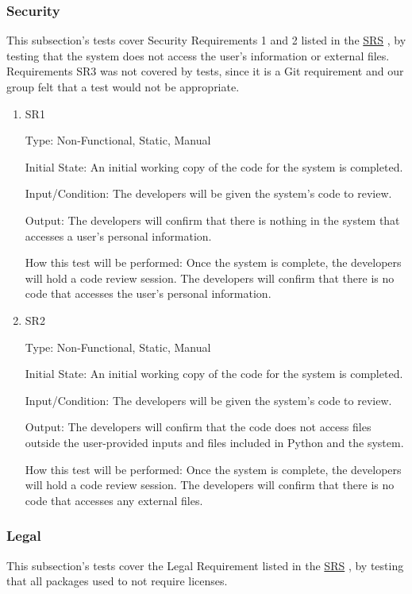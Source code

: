 \documentclass[12pt, titlepage]{article}
\begin{document}
\subsubsection{Security}
This subsection's tests cover Security Requirements 1 and 2 listed in the \href{https://github.com/paezha/PyERT-BLACK/blob/main/docs/SRS/SRS.pdf}{SRS} \citep{SRS}, by testing that the system does not access the user's information or external files. Requirements SR3 was not covered by tests, since it is a Git requirement and our group felt that a test would not be appropriate.

\begin{enumerate}

\item{SR1\\}\label{SR1}

Type: Non-Functional, Static, Manual
					
Initial State: 
An initial working copy of the code for the system is completed.

Input/Condition: 
The developers will be given the system's code to review.

Output: The developers will confirm that there is nothing in the system that accesses a user's personal information.

How this test will be performed:  Once the system is complete, the developers will hold a code review session. The developers will confirm that there is no code that accesses the user's personal information.
\\
\item{SR2\\}\label{SR2}

Type: Non-Functional, Static, Manual
					
Initial State: 
An initial working copy of the code for the system is completed.

Input/Condition: 
The developers will be given the system's code to review.

Output: The developers will confirm that the code does not access files outside the user-provided inputs and files included in Python and the system.

How this test will be performed:  Once the system is complete, the developers will hold a code review session. The developers will confirm that there is no code that accesses any external files.

\end{enumerate}

\subsubsection{Legal}
This subsection's tests cover the Legal Requirement listed in the \href{https://github.com/paezha/PyERT-BLACK/blob/main/docs/SRS/SRS.pdf}{SRS} \citep{SRS}, by testing that all packages used to not require licenses.
\end{document}

